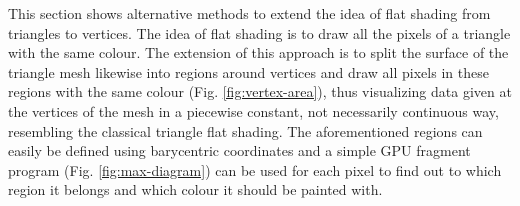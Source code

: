 \label{section:vertex-area-chapter}
This section shows alternative methods to extend the idea of flat shading from triangles to vertices. The idea of flat shading is to draw all the pixels of a triangle with the same colour. The extension of this approach is to split the surface of the triangle mesh likewise into regions around vertices and draw all pixels in these regions with the same colour (Fig. \ref{fig:vertex-area}), thus visualizing data given at the vertices of the mesh in a piecewise constant, not necessarily continuous way, resembling the classical triangle flat shading. The aforementioned regions can easily be defined using barycentric coordinates and a simple GPU fragment program (Fig. \ref{fig:max-diagram}) can be used for each pixel to find out to which region it belongs and which colour it should be painted with.




